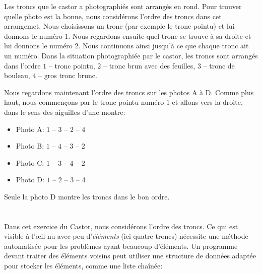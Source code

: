 {{Les troncs que le castor a photographiés sont arrangés en rond. Pour trouver quelle photo est la bonne, nous considérons l’ordre des troncs dans cet arrangemet. Nous choisissons un tronc (par exemple le tronc pointu) et lui donnons le numéro $1$. Nous regardons ensuite quel tronc se trouve à sa droite et lui donnons le numéro $2$. Nous continuons ainsi jusqu’à ce que chaque tronc ait un numéro. Dans la situation photographiée par le castor, les troncs sont arrangés dans l’ordre $1$ – tronc pointu, $2$ – tronc brun avec des feuilles, $3$ – tronc de bouleau, $4$ – gros tronc brunc.

{\centering%
\par}

Nous regardons maintenant l’ordre des troncs sur les photos A à D. Comme plus haut, nous commençons par le tronc pointu numéro $1$ et allons vers la droite, dans le sens des aiguilles d’une montre:

\begin{itemize}
  \item Photo A: $1$ – $3$ – $2$ – 4
  \item Photo B: $1$ – $4$ – $3$ – 2
  \item Photo C: $1$ – $3$ – $4$ – 2
  \item Photo D: $1$ – $2$ – $3$ – 4
\end{itemize}

Seule la photo D montre les troncs dans le bon ordre.

{\centering%
\par}



\section*{\BrochureItsInformatics}
Dans cet exercice du Castor, nous considérons l’ordre des troncs. Ce qui est visible à l’œil nu avec peu d’\emph{éléments} (ici quatre troncs) nécessite une méthode automatisée pour les problèmes ayant beaucoup d’éléments. Un programme devant traiter des éléments voisins peut utiliser une structure de données adaptée pour stocker les éléments, comme une liste chaînée:

{\centering%
\par}

}}
